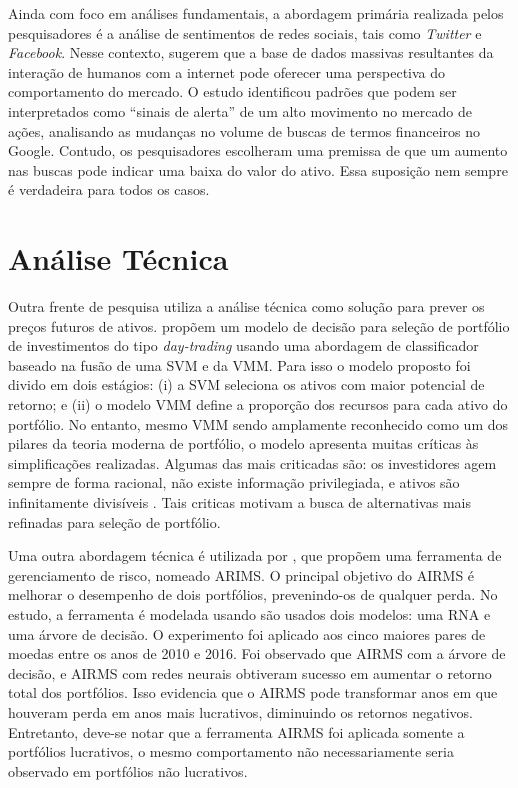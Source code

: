 Ainda com foco em análises fundamentais, a abordagem primária realizada pelos pesquisadores é a análise de sentimentos de redes sociais, tais como \textit{Twitter} e \textit{Facebook}. Nesse contexto, \textcite{google_trends} sugerem que a base de dados massivas resultantes da interação de humanos com a internet pode oferecer uma perspectiva do comportamento do mercado. O estudo identificou padrões que podem ser interpretados como ``sinais de alerta'' de um alto movimento no mercado de ações, analisando as mudanças no volume de buscas de termos financeiros no Google. Contudo, os pesquisadores escolheram uma premissa de que um aumento nas buscas pode indicar uma baixa do valor do ativo. Essa suposição nem sempre é verdadeira para todos os casos.

\section{Análise Técnica}

Outra frente de pesquisa utiliza a análise técnica como solução para prever os preços futuros de ativos. \textcite{fusionportifolio} propõem um modelo de decisão para seleção de portfólio de investimentos do tipo \emph{day-trading} usando uma abordagem de classificador baseado na fusão de uma \acrfull{SVM} e da \acrfull{VMM}. Para isso o modelo proposto foi divido em dois estágios: (i) a \acrshort{SVM} seleciona os ativos com maior potencial de retorno; e (ii) o modelo \acrshort{VMM} define a proporção dos recursos para cada ativo do portfólio. No entanto, mesmo \acrshort{VMM} sendo amplamente reconhecido como um dos pilares da teoria moderna de portfólio, o modelo apresenta muitas críticas às simplificações realizadas. Algumas das mais criticadas são: os investidores agem sempre de forma racional, não existe informação privilegiada, e ativos são infinitamente divisíveis \cite{cesarone2011portfolio}. Tais criticas motivam a busca de alternativas mais refinadas para seleção de portfólio. 

Uma outra abordagem técnica é utilizada por \textcite{airms}, que propõem uma ferramenta de gerenciamento de risco, nomeado ARIMS. O principal objetivo do AIRMS é melhorar o desempenho de dois portfólios, prevenindo-os de qualquer perda. No estudo, a ferramenta é modelada usando são usados dois modelos: uma \acrfull{RNA} e uma árvore de decisão. O experimento foi aplicado aos cinco maiores pares de moedas entre os anos de 2010 e 2016. Foi observado que AIRMS com a árvore de decisão, e AIRMS com redes neurais obtiveram sucesso em aumentar o retorno total dos portfólios. Isso evidencia que o AIRMS pode transformar anos em que houveram perda em anos mais lucrativos, diminuindo os retornos negativos. Entretanto, deve-se notar que a ferramenta AIRMS foi aplicada somente a portfólios lucrativos, o mesmo comportamento não necessariamente seria observado em portfólios não lucrativos.

